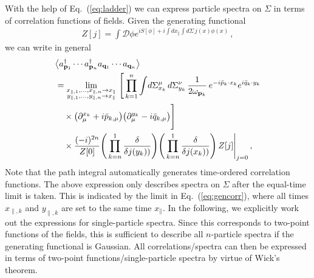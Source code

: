\documentclass[reprint,superscriptaddress,english,preprintnumbers,amsmath,amssymb,aps,prx]{revtex4-2}
\def\Eq#1{Eq.~(\ref{#1})}
\begin{document}
With the help of \Eq{eq:ladder} we can express particle spectra on $\Sigma$ in terms of correlation functions of fields. Given the generating functional
\begin{align}\label{eq:Z}
Z[j] = \int\!\mathcal{D}\phi e^{iS[\phi]+i\int\!dx_\parallel\int\!d\Sigma\, j(x)\phi(x)}\,,
\end{align}
we can write in general
\begin{align}\label{eq:gencorr}
\begin{split}
&\big\langle a_{\bold{p}_1}^\dagger \cdots a_{\bold{p}_n}^\dagger a_{\bold{q}_1} \cdots a_{\bold{q}_n} \big\rangle\\ 
&= \lim_{\substack{x_{\parallel,1},\dots,x_{\parallel,n}\rightarrow x_\parallel\\y_{\parallel,1},\dots,y_{\parallel,n}\rightarrow x_\parallel}}\, \Bigg[\prod_{k=1}^n \int\!d\Sigma_{x_k}^\mu\,d\Sigma_{y_k}^{\nu}\, \frac{1}{2\omega_{\bold{p}_{k}}}\, e^{-i\bar p_k \cdot x_k} e^{i \bar q_k \cdot y_k}\\
&\quad\times \big(\partial_{\mu}^{x_k}+i\bar p_{k,\mu}\big)\big(\partial_{\mu}^{y_k}-i\bar q_{k,\mu}\big) \Bigg]\\
&\quad \times \frac{(-i)^{2n}}{Z[0]} \Bigg( \prod_{k=n}^1 \frac{\delta}{\delta j(y_k))}  \Bigg)\Bigg( \prod_{k=n}^1 \frac{\delta}{\delta j(x_k))}  \Bigg)\, Z[j]\Bigg|_{j=0}\,,
\end{split}
\end{align}
Note that the path integral automatically generates time-ordered correlation functions. The above expression only describes spectra on $\Sigma$ after the equal-time limit is taken. This is indicated by the limit in \Eq{eq:gencorr}, where all times $x_{\parallel,k}$ and $y_{\parallel,k}$ are set to the same time $x_\parallel$.
In the following, we explicitly work out the expressions for single-particle spectra. Since this corresponds to two-point functions of the fields, this is sufficient to describe all $n$-particle spectra if the generating functional is Gaussian. All correlations/spectra can then be expressed in terms of two-point functions/single-particle spectra by virtue of Wick's theorem.
\end{document}
